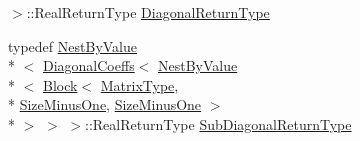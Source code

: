 \begin{DoxyCompactItemize}
 $>$\-::Real\-Return\-Type \hyperlink{class_hessenberg_decomposition_a106d23099756c3db13dfdecac91b9250}{Diagonal\-Return\-Type}
\item 
typedef \hyperlink{class_nest_by_value}{Nest\-By\-Value}\\*
$<$ \hyperlink{class_diagonal_coeffs}{Diagonal\-Coeffs}$<$ \hyperlink{class_nest_by_value}{Nest\-By\-Value}\\*
$<$ \hyperlink{class_block}{Block}$<$ \hyperlink{class_hessenberg_decomposition_a9ecabc0c14a42b62ef12497bd48a0d44}{Matrix\-Type}, \\*
\hyperlink{class_hessenberg_decomposition_a66c0a2c644571e4a7b784c7738a81f9dae787f92f691d17275bfc8b3c49d4f1ea}{Size\-Minus\-One}, \hyperlink{class_hessenberg_decomposition_a66c0a2c644571e4a7b784c7738a81f9dae787f92f691d17275bfc8b3c49d4f1ea}{Size\-Minus\-One} $>$\\*
 $>$ $>$ $>$\-::Real\-Return\-Type \hyperlink{class_hessenberg_decomposition_a749ce594d9130ea0d804627d86672749}{Sub\-Diagonal\-Return\-Type}
\end{DoxyCompactItemize}
